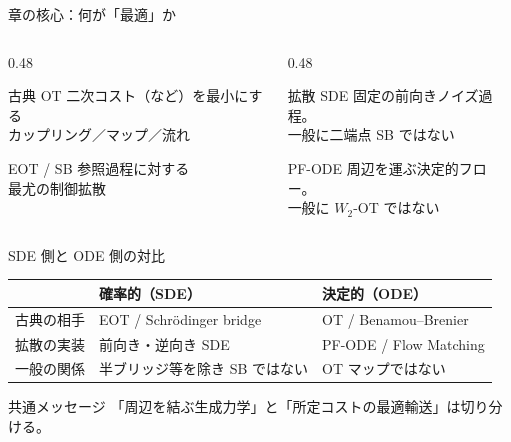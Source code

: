 \begin{frame}{章の核心：何が「最適」か}
    \begin{columns}[T,onlytextwidth]
        \begin{column}{0.48\textwidth}
            \begin{block}{古典 OT}
                二次コスト（など）を最小にする\\
                カップリング／マップ／流れ
            \end{block}
            \begin{block}{EOT / SB}
                参照過程に対する\\
                最尤の制御拡散
            \end{block}
        \end{column}
        \begin{column}{0.48\textwidth}
            \begin{block}{拡散 SDE}
                固定の前向きノイズ過程。\\
                一般に二端点 SB ではない
            \end{block}
            \begin{block}{PF-ODE}
                周辺を運ぶ決定的フロー。\\
                一般に $W_2$-OT ではない
            \end{block}
        \end{column}
    \end{columns}
\end{frame}
\asmain
\begin{frame}{SDE 側と ODE 側の対比}
    \renewcommand{\arraystretch}{1.3}
    \begin{tabular}{lll}
        & \textbf{確率的（SDE）} & \textbf{決定的（ODE）} \\
        \hline
        古典の相手 & EOT / Schr\"odinger bridge & OT / Benamou--Brenier \\
        拡散の実装 & 前向き・逆向き SDE & PF-ODE / Flow Matching \\
        一般の関係 & 半ブリッジ等を除き SB ではない & OT マップではない \\
    \end{tabular}
    \vfill
    \begin{exampleblock}{共通メッセージ}
        「周辺を結ぶ生成力学」と「所定コストの最適輸送」は切り分ける。
    \end{exampleblock}
\end{frame}
